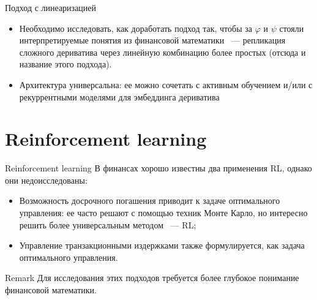 \documentclass[10pt]{beamer}
\renewcommand{\phi}{\varphi}
\begin{document}
    \begin{frame}{Подход с линеаризацией}
        \begin{itemize}
            \item Необходимо исследовать, как доработать подход так, чтобы за $\phi$ и $\psi$ стояли интерпретируемые понятия из финансовой математики 
            ~--- репликация сложного дериватива через линейную комбинацию более простых (отсюда и название этого подхода).
            \item Архитектура универсальна: ее можно сочетать с активным обучением и/или с рекуррентными моделями для эмбеддинга дериватива
        \end{itemize}
    \end{frame}

    \section{Reinforcement learning}
    \begin{frame}{Reinforcement learning}
        В финансах хорошо известны два применения RL, однако они недоисследованы:
        \begin{itemize}
            \item Возможность досрочного погашения приводит к задаче оптимального управления: 
            ее часто решают с помощью техник Монте Карло, но интересно решить более универсальным методом ~--- RL;
            \item Управление транзакционными издержками также формулируется, как задача оптимального управления.
        \end{itemize}

        \begin{block}{Remark}
            Для исследования этих подходов требуется более глубокое понимание финансовой математики.
        \end{block}
    \end{frame}
\end{document}
